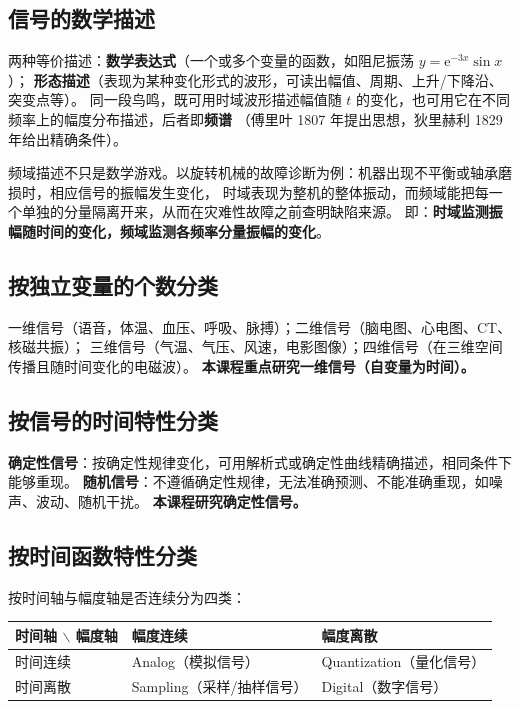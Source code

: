 \subsection{信号的数学描述}

两种等价描述：\textbf{数学表达式}（一个或多个变量的函数，如阻尼振荡 $y=\mathrm{e}^{-3x}\sin x$）；
\textbf{形态描述}（表现为某种变化形式的波形，可读出幅值、周期、上升/下降沿、突变点等）。
同一段鸟鸣，既可用时域波形描述幅值随 $t$ 的变化，也可用它在不同频率上的幅度分布描述，后者即\textbf{频谱}
（傅里叶 1807 年提出思想，狄里赫利 1829 年给出精确条件）。

频域描述不只是数学游戏。以旋转机械的故障诊断为例：机器出现不平衡或轴承磨损时，相应信号的振幅发生变化，
时域表现为整机的整体振动，而频域能把每一个单独的分量隔离开来，从而在灾难性故障之前查明缺陷来源。
即：\textbf{时域监测振幅随时间的变化，频域监测各频率分量振幅的变化}。

\subsection{按独立变量的个数分类}

一维信号（语音，体温、血压、呼吸、脉搏）；二维信号（脑电图、心电图、CT、核磁共振）；
三维信号（气温、气压、风速，电影图像）；四维信号（在三维空间传播且随时间变化的电磁波）。
\textbf{本课程重点研究一维信号（自变量为时间）。}

\subsection{按信号的时间特性分类}

\textbf{确定性信号}：按确定性规律变化，可用解析式或确定性曲线精确描述，相同条件下能够重现。
\textbf{随机信号}：不遵循确定性规律，无法准确预测、不能准确重现，如噪声、波动、随机干扰。
\textbf{本课程研究确定性信号。}

\subsection{按时间函数特性分类}

按时间轴与幅度轴是否连续分为四类：

\begin{center}
\begin{tabular}{lll}
\toprule
时间轴 $\backslash$ 幅度轴 & 幅度连续 & 幅度离散 \\
\midrule
时间连续 & Analog（模拟信号） & Quantization（量化信号） \\
时间离散 & Sampling（采样/抽样信号） & Digital（数字信号） \\
\bottomrule
\end{tabular}
\end{center}

